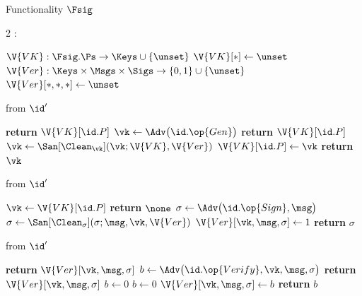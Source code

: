 \begin{interface}[nofloat]{Functionality $\Fsig$ \\
\params{$\PID$, \quad $\Ps$, \quad $\admits$, \quad
$\uses := \{(\Adv,\serves)\}$, \quad $\pars := \none$}}

{\scriptsize
\setlength{\columnsep}{1.4em}
\begin{multicols}{2}
:
\begin{algorithmic}[1]
\setcounter{contline}{0}\algcont
\State $\V{VK} : \Fsig.\Ps \to \Keys \cup \{\unset\}$
\State $\V{VK}[*] \gets \unset$
\State $\V{Ver} : \Keys \times \Msgs \times \Sigs \to \{0,1\} \cup \{\unset\}$
\State $\V{Ver}[*,*,*] \gets \unset$
\algsave
\end{algorithmic}
\vspace{1.4ex}

 \quad from $\id'$
\begin{algorithmic}[1]
\algcont
{}
  \State \textbf{return} $\V{VK}[\id.P]$
\EndIf
\State $\vk \gets \Adv\bigl(\id.\op{Gen}\bigr)$
  \State \textbf{return} $\V{VK}[\id.P]$
\EndIf
\State $\vk \gets \San[\Clean_{\vk}](\vk; \V{VK}, \V{Ver})$
\State $\V{VK}[\id.P] \gets \vk$
\State \textbf{return} $\vk$
\algsave
\end{algorithmic}
\vspace{1.4ex}

 \quad from $\id'$
\begin{algorithmic}[1]
\algcont
\State $\vk \gets \V{VK}[\id.P]$
\If{$\vk = \unset$}
  \State \textbf{return} $\none$
\EndIf
\State $\sigma \gets \Adv\bigl(\id.\op{Sign}, \msg\bigr)$
\State $\sigma \gets \San[\Clean_{\sigma}](\sigma; \msg, \vk, \V{Ver})$
\State $\V{Ver}[\vk, \msg, \sigma] \gets 1$
\State \textbf{return} $\sigma$
\algsave
\end{algorithmic}
\vspace{1.4ex}

\columnbreak

 \quad from $\id'$
\begin{algorithmic}[1]
\algcont
{}
  \State \textbf{return} $\V{Ver}[\vk, \msg, \sigma]$
\EndIf
\State $b \gets \Adv\bigl(\id.\op{Verify}, \vk, \msg, \sigma\bigr)$
  \State \textbf{return} $\V{Ver}[\vk, \msg, \sigma]$
\EndIf
{}
  \State $b \gets 0$
\EndIf
{}
  \State $b \gets 0$
\EndIf
\State $\V{Ver}[\vk, \msg, \sigma] \gets b$
\State \textbf{return} $b$
\algsave
\end{algorithmic}
\vspace{1.4ex}


\end{multicols}}
\end{interface}
